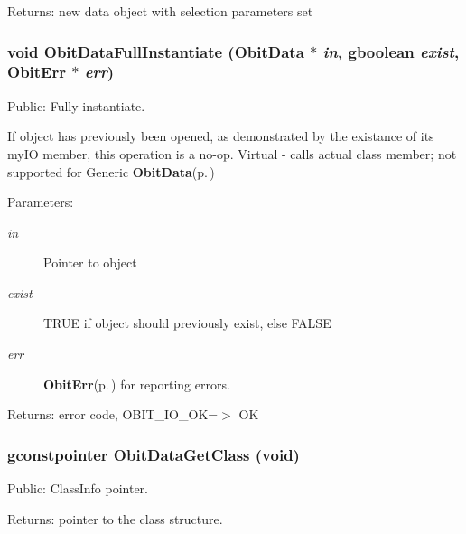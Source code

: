 \begin{Desc}
\item[Returns:]new data object with selection parameters set \end{Desc}
\subsubsection{\setlength{\rightskip}{0pt plus 5cm}void Obit\-Data\-Full\-Instantiate ({\bf Obit\-Data} $\ast$ {\em in}, gboolean {\em exist}, {\bf Obit\-Err} $\ast$ {\em err})}\label{ObitData_8h_a30}


Public: Fully instantiate. 

If object has previously been opened, as demonstrated by the existance of its my\-IO member, this operation is a no-op. Virtual - calls actual class member; not supported for Generic {\bf Obit\-Data}{\rm (p.\,\pageref{structObitData})} \begin{Desc}
\item[Parameters:]
\begin{description}
\item[{\em in}]Pointer to object \item[{\em exist}]TRUE if object should previously exist, else FALSE \item[{\em err}]{\bf Obit\-Err}{\rm (p.\,\pageref{structObitErr})} for reporting errors. \end{description}
\end{Desc}
\begin{Desc}
\item[Returns:]error code, OBIT\_\-IO\_\-OK=$>$ OK \end{Desc}
\subsubsection{\setlength{\rightskip}{0pt plus 5cm}gconstpointer Obit\-Data\-Get\-Class (void)}\label{ObitData_8h_a31}


Public: Class\-Info pointer. 

\begin{Desc}
\item[Returns:]pointer to the class structure. \end{Desc}
